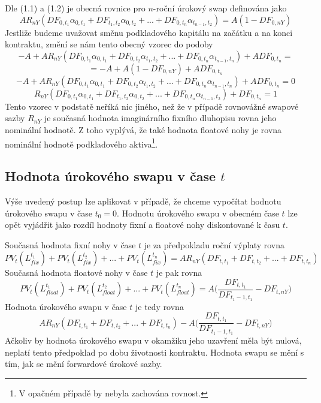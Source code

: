 \documentclass[a4paper]{book}
\begin{document}
Dle (1.1) a (1.2) je obecná rovnice pro $n$-roční úrokový swap definována jako
\begin{equation*}
AR_{nY}(DF_{0,t_1} \alpha_{0,t_1} + DF_{t_1, t_2} \alpha_{0,t_2} + ... + DF_{0, t_n} \alpha_{t_{n-1},t_2}) = A(1 - DF_{0,nY})
\end{equation*}
Jestliže budeme uvažovat směnu podkladového kapitálu na začátku a na konci kontraktu, změní se nám tento obecný vzorec do podoby
\begin{equation*}
-A + AR_{nY}(DF_{0,t_1} \alpha_{0,t_1} + DF_{0, t_2} \alpha_{t_1,t_2} + ... + DF_{0, t_n} \alpha_{t_{n-1},t_n}) + A DF_{0, t_n} =
\end{equation*}
\begin{equation*}
= -A + A(1 - DF_{0,nY}) + A DF_{0, t_n}
\end{equation*}
\begin{equation*}
-A + AR_{nY}(DF_{0,t_1} \alpha_{0,t_1} + DF_{0, t_2} \alpha_{t_1,t_2} + ... + DF_{0, t_n} \alpha_{t_{n-1},t_n}) + A DF_{0, t_n} = 0
\end{equation*}
\begin{equation*}
R_{nY}(DF_{0,t_1} \alpha_{0,t_1} + DF_{t_1, t_2} \alpha_{0,t_2} + ... + DF_{0, t_n} \alpha_{t_{n-1},t_2}) + DF_{0, t_n} = 1
\end{equation*}
Tento vzorec v podstatě neříká nic jiného, než že v případě rovnovážné swapové sazby $R_{nY}$ je současná hodnota imaginárního fixního dluhopisu rovna jeho nominální hodnotě. Z toho vyplývá, že také hodnota floatové nohy je rovna nominální hodnotě podkladového aktiva\footnote{V opačném případě by nebyla zachována rovnost.}. 

\subsection{Hodnota úrokového swapu v čase $t$}

Výše uvedený postup lze aplikovat v případě, že chceme vypočítat hodnotu úrokového swapu v čase $t_0 = 0$. Hodnotu úrokového swapu v obecném čase $t$ lze opět vyjádřit jako rozdíl hodnoty fixní a floatové nohy diskontované k času $t$.

Současná hodnota fixní nohy v čase $t$ je za předpokladu roční výplaty rovna
\begin{equation*}
PV_t(L_{fix}^{t_1}) + PV_t(L_{fix}^{t_2}) + ... + PV_t(L_{fix}^{t_n}) = A R_{nY}(DF_{t, t_1} + DF_{t, t_2} + ... + DF_{t, t_n})
\end{equation*}
Současná hodnota floatové nohy v čase $t$ je pak rovna
\begin{equation*}
PV_t(L_{float}^{t_1}) + PV_t(L_{float}^{t_2}) + ... + PV_t(L_{float}^{t_n}) = A \bigg(\frac{DF_{t,t_1}}{DF_{t_1 - 1, t_1}} - DF_{t, nY} \bigg)
\end{equation*}
Hodnota úrokového swapu v čase $t$ je tedy rovna
\begin{equation*}
A R_{nY}(DF_{t, t_1} + DF_{t, t_2} + ... + DF_{t, t_n}) - A \bigg(\frac{DF_{t,t_1}}{DF_{t_1 - 1, t_1}} - DF_{t, nY} \bigg)
\end{equation*}
Ačkoliv by hodnota úrokového swapu v okamžiku jeho uzavření měla být nulová, neplatí tento předpoklad po dobu životnosti kontraktu. Hodnota swapu se mění s tím, jak se mění forwardové úrokové sazby.
\end{document}
